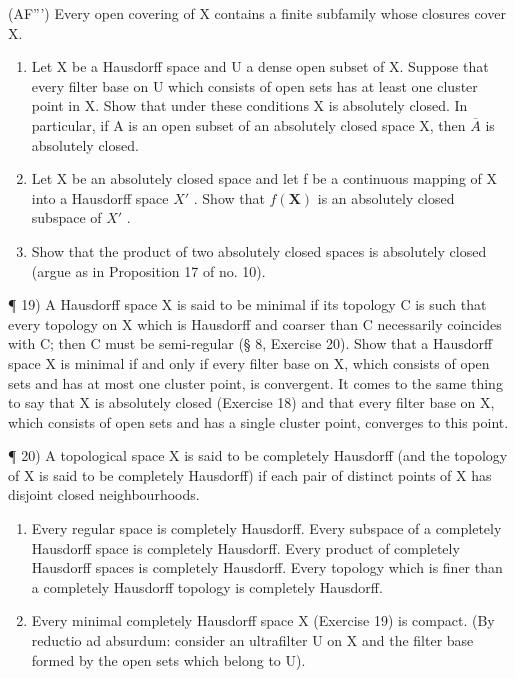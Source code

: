 (AF''') Every open covering of X contains a finite subfamily whose closures cover X.

\begin{enumerate}
\def\labelenumi{\alph{enumi})}
\setcounter{enumi}{1}
\item
  Let X be a Hausdorff space and U a dense open subset of X. Suppose that every filter base on U which consists of open sets has at least one cluster point in X. Show that under these conditions X is absolutely closed. In particular, if A is an open subset of an absolutely closed space X, then \(\overline{A}\) is absolutely closed.
\item
  Let X be an absolutely closed space and let f be a continuous mapping of X into a Hausdorff space \(X'\) . Show that \(f(\mathbf{X})\) is an absolutely closed subspace of \(X'\) .
\item
  Show that the product of two absolutely closed spaces is absolutely closed (argue as in Proposition 17 of no. 10).
\end{enumerate}

¶ 19) A Hausdorff space X is said to be minimal if its topology C is such that every topology on X which is Hausdorff and coarser than C necessarily coincides with C; then C must be semi-regular (§ 8, Exercise 20). Show that a Hausdorff space X is minimal if and only if every filter base on X, which consists of open sets and has at most one cluster point, is convergent. It comes to the same thing to say that X is absolutely closed (Exercise 18) and that every filter base on X, which consists of open sets and has a single cluster point, converges to this point.

¶ 20) A topological space X is said to be completely Hausdorff (and the topology of X is said to be completely Hausdorff) if each pair of distinct points of X has disjoint closed neighbourhoods.

\begin{enumerate}
\def\labelenumi{\alph{enumi})}
\item
  Every regular space is completely Hausdorff. Every subspace of a completely Hausdorff space is completely Hausdorff. Every product of completely Hausdorff spaces is completely Hausdorff. Every topology which is finer than a completely Hausdorff topology is completely Hausdorff.
\item
  Every minimal completely Hausdorff space X (Exercise 19) is compact. (By reductio ad absurdum: consider an ultrafilter U on X and the filter base formed by the open sets which belong to U).
\end{enumerate}

